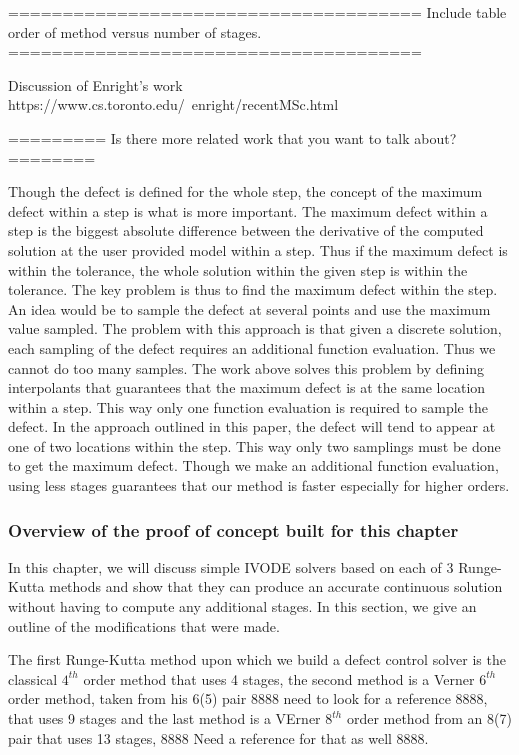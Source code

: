 \documentclass{article}
\begin{document}
======================================
Include table order of method versus number of stages.
======================================

Discussion of Enright's work
https://www.cs.toronto.edu/~enright/recentMSc.html

=========
Is there more related work that you want to talk about?
========

Though the defect is defined for the whole step, the concept of the maximum defect within a step is what is more important. The maximum defect within a step is the biggest absolute difference between the derivative of the computed solution at the user provided model within a step. Thus if the maximum defect is within the tolerance, the whole solution within the given step is within the tolerance. The key problem is thus to find the maximum defect within the step. An idea would be to sample the defect at several points and use the maximum value sampled. The problem with this approach is that given a discrete solution, each sampling of the defect requires an additional function evaluation. Thus we cannot do too many samples. The work above solves this problem by defining interpolants that guarantees that the maximum defect is at the same location within a step. This way only one function evaluation is required to sample the defect. In the approach outlined in this paper, the defect will tend to appear at one of two locations within the step. This way only two samplings must be done to get the maximum defect. Though we make an additional function evaluation, using less stages guarantees that our method is faster especially for higher orders.


\subsubsection{Overview of the proof of concept built for this chapter}
\label{section:basic_runge_kutta}
In this chapter, we will discuss simple IVODE solvers based on each of 3 Runge-Kutta methods and show that they can produce an accurate continuous solution without having to compute any additional stages. In this section, we give an outline of the modifications that were made.

The first Runge-Kutta method upon which we build a defect control solver is the classical $4^{th}$ order method that uses 4 stages, the second method is a Verner $6^{th}$ order method, taken from his 6(5) pair 8888 need to look for a reference 8888, that uses 9 stages and the last method is a VErner $8^{th}$ order method from an 8(7) pair that uses 13 stages, 8888 Need a reference for that as well 8888. 
\end{document}
